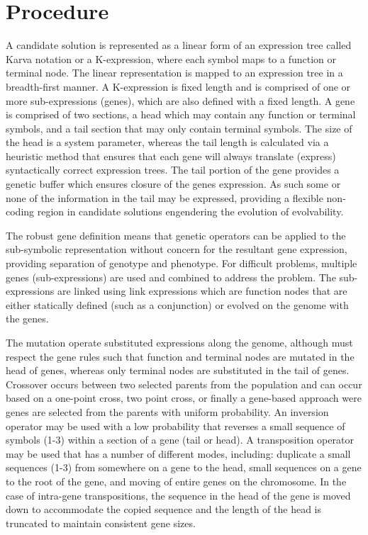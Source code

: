 \documentclass[a4paper, 11pt]{article}
\begin{document}
\section{Procedure}
\label{sec:procedure}
A candidate solution is represented as a linear form of an expression tree called Karva notation or a K-expression, where each symbol maps to a function or terminal node. The linear representation is mapped to an expression tree in a breadth-first manner. 
A K-expression is fixed length and is comprised of one or more sub-expressions (genes), which are also defined with a fixed length. A gene is comprised of two sections, a head which may contain any function or terminal symbols, and a tail section that may only contain terminal symbols. The size of the head is a system parameter, whereas the tail length is calculated via a heuristic method that ensures that each gene will always translate (express) syntactically correct expression trees. The tail portion of the gene provides a genetic buffer which ensures closure of the genes expression. As such some or none of the information in the tail may be expressed, providing a flexible non-coding region in candidate solutions engendering the evolution of evolvability. 

The robust gene definition means that genetic operators can be applied to the sub-symbolic representation without concern for the resultant gene expression, providing separation of genotype and phenotype. For difficult problems, multiple genes (sub-expressions) are used and combined to address the problem. The sub-expressions are linked using link expressions which are function nodes that are either statically defined (such as a conjunction) or evolved on the genome with the genes.

The mutation operate substituted expressions along the genome, although must respect the gene rules such that function and terminal nodes are mutated in the head of genes, whereas only terminal nodes are substituted in the tail of genes. Crossover occurs between two selected parents from the population and can occur based on a one-point cross, two point cross, or finally a gene-based approach were genes are selected from the parents with uniform probability.
An inversion operator may be used with a low probability that reverses a small sequence of symbols (1-3) within a section of a gene (tail or head). A transposition operator may be used that has a number of different modes, including: duplicate a small sequences (1-3) from somewhere on a gene to the head, small sequences on a gene to the root of the gene, and moving of entire genes on the chromosome. In the case of intra-gene transpositions, the sequence in the head of the gene is moved down to accommodate the copied sequence and the length of the head is truncated to maintain consistent gene sizes.
\end{document}
